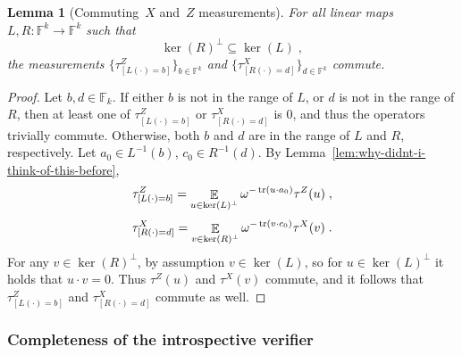 \documentclass[11pt]{article}
\newtheorem{lemma}[theorem]{Lemma}
\theoremstyle{definition}
\newcommand{\F}{\ensuremath{\mathbb{F}}}
\DeclareMathOperator{\tr}{tr}
\newcommand{\E}{\mathop{\mathbb{E}}\displaylimits}
\begin{document}
\begin{lemma}[Commuting~$X$ and~$Z$ measurements]
  \label{lem:commute} 
	For all linear maps $L,R: \F^k \to \F^k$ such that
  \begin{equation*}
    \ker (R)^\perp \subseteq \ker (L)\;,
  \end{equation*}
  the measurements
  $\big\{ \tau^Z_{[L(\cdot)=b]} \big\}_{b\in \F^k}$ and $\big\{ \tau^X_{[R(\cdot) = d]}
  \big\}_{d\in \F^k}$ commute.
\end{lemma}
\begin{proof}
  Let $b,d\in \F_k$.
  If either $b$ is not in the range of $L$, or $d$ is not in the range of $R$,
  then at least one of $\tau^Z_{[L(\cdot) = b]}$ or $\tau^X_{[R(\cdot) = d]}$ is
  $0$, and thus the operators trivially commute.
  Otherwise, both $b$ and $d$ are in the range of $L$ and $R$, respectively.
  Let $a_0 \in L^{-1}(b)$, $c_0 \in R^{-1}(d)$.
  By Lemma~\ref{lem:why-didnt-i-think-of-this-before},
  \begin{equation*}
    \tau^Z_{[L(\cdot)=b]} = \E_{u \in \ker(L)^\perp}
    \omega^{-\tr(u \cdot a_0)} \tau^Z(u)\;,
  \end{equation*}
  \begin{equation*}
    \tau^X_{[R(\cdot)=d]} = \E_{v \in \ker(R)^\perp}
    \omega^{-\tr(v \cdot c_0)} \tau^X(v)\;.
  \end{equation*}
  For any $v \in \ker(R)^\perp$, by assumption $v\in \ker(L)$, so for $u \in
  \ker(L)^\perp$ it holds that $u\cdot v=0$.
  Thus $\tau^Z(u)$ and $\tau^X(v)$ commute, and it follows that
  $\tau^Z_{[L(\cdot)=b]}$ and $\tau^X_{[R(\cdot)=d]}$ commute as well.
\end{proof}

\subsubsection{Completeness of the introspective verifier}
\label{sec:intro-completeness-sub}
\end{document}
